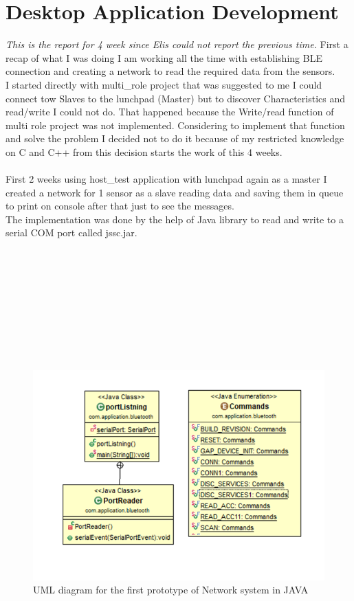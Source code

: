 \documentclass[12pt]{article}
\begin{document}
\section{Desktop Application Development}\cite{vendor}\cite{devguide}\cite{userguide}
\textit{This is the report for 4 week since Elis could not report the previous time.}
First a recap of what I was doing I am working all the time with establishing BLE  connection and creating a network to read the required data from the sensors.\\
I started directly with multi\_role project that was suggested to me I could connect tow Slaves to the lunchpad (Master) but to discover Characteristics and read/write I could not do. That happened because the Write/read function of multi role project was not implemented. Considering to implement that function and solve the problem I decided not to do it because of my restricted knowledge on C and C++ from this decision starts the work of this 4 weeks.\\\\
First 2 weeks using host\_test application with lunchpad again as a master I created a network for 1 sensor as a slave reading data and saving them in queue to print on console after that just to see the messages.\\
The implementation was done by the help of Java library to read and write to a serial COM port called jssc.jar.\\\\\\\\\\\\\\\\\\\\
\begin{figure}[h]
	\centering
	\includegraphics[scale=0.60]{images/UML1.png}
	\caption{UML diagram for the first prototype of Network system in JAVA}
	\label{img:UML1}
\end{figure}
\end{document}
